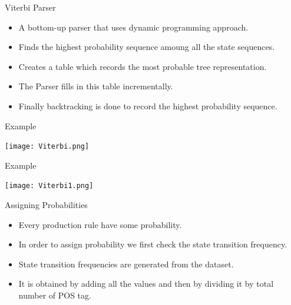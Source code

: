 \documentclass{beamer}
\begin{document}
\begin{frame}{Viterbi Parser}
\begin{itemize}
	\item A bottom-up parser that uses dynamic programming approach.
	\vspace{0.5em}
	\item Finds the highest probability sequence amoung all the state sequences. \\  
	\vspace{0.5em}
	\item Creates a table which records the most probable tree representation. \\
	\vspace{0.5em}
	\item  The Parser fills in this table incrementally.\\
	\vspace{0.5em}
	\item Finally backtracking is done to record the highest probability sequence. 
\end{itemize}
\end{frame}



\begin{frame}{Example}
\begin{center}
	\texttt{[image: Viterbi.png]}	
\end{center}
\end{frame}


\begin{frame}{Example}
\begin{center}
	\texttt{[image: Viterbi1.png]}	
\end{center}
\end{frame}



\begin{frame}{Assigning Probabilities}
\begin{itemize}
	\item Every production rule have some probability. \\
	\vspace{0.5em}
	\item In order to assign probability we first check the state transition frequency. \\
	\vspace{0.5em}
	\item State transition frequencies are generated from the dataset. \\
	\vspace{0.5em}
	\item It is obtained by adding all the values and then by dividing it by total number of POS tag. \\
	\vspace{0.5em}                   
\end{itemize}
\end{frame}
\end{document}
